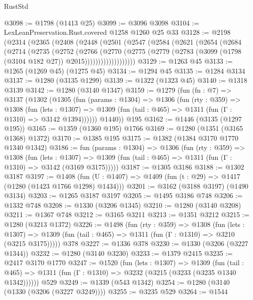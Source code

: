 \begin{lexlean}{RustStd}
\begin{coremodule}
@3098 := @1798 (@1413 @25)
@3099 := @3096 @3098
@3104 := LexLeanPreservation.Rust.covered @1258 @1260 @25 @33
@3128 := @2198
    (@2314
      (@2365
        (@2408
          (@2448
            (@2501
              (@2547
                (@2584
                  (@2621
                    (@2654
                      (@2684
                        (@2714
                          (@2735
                            (@2752
                              (@2766
                                (@2770
                                  (@2775
                                    (@2779
                                      (@2783
                                        (@3099 (@1798 (@3104 @182 @27)) @2015)))))))))))))))))))
@3129 := @1263 @45
@3133 := @1265 (@1269 @45) (@1275 @45)
@3134 := @1294 @45
@3135 := @1284 @3134
@3137 := @1280 (@3135 @1299)
@3139 := @1322 (@1323 @45)
@3140 := @1318 @3139
@3142 := @1280 (@3140 @1347)
@3159 := @1279
    (fun (fn : @7) =>
    @3137
      (@1302
        (@1305
          (fun (params : @1304) =>
          @1306
            (fun (rty : @359) =>
            @1308
              (fun (lets : @1307) =>
              @1309 (fun (tail : @465) => @1311 (fun (Γ : @1310) => @3142 @1394))))))
        @1440))
    @195
@3162 := @1446 (@3135 (@1297 @195))
@3165 := @1359 (@1360 @195) @1766
@3169 := @1280 (@1351 (@3165 @1368) @1372)
@3170 := @1385 @195
@3175 := @1382 (@1384 @3170 @1770 @1340 @1342)
@3186 := fun (params : @1304) =>
  @1306
    (fun (rty : @359) =>
    @1308
      (fun (lets : @1307) =>
      @1309 (fun (tail : @465) => @1311 (fun (Γ : @1310) => @3142 (@3169 @3175)))))
@3187 := @1305 @3186
@3188 := @1302 @3187
@3197 := @1408 (fun (U : @1407) => @1409 (fun (t : @29) => @1417 (@1280 (@1423 @1766 @1298) @1434)))
@3201 := @3162 (@3188 @3197) (@1490 @3134)
@3203 := @1265 @3187 @3197
@3205 := @1495 @3186 @748
@3206 := @1332 @748
@3208 := @1330 (@3206 @1345)
@3210 := @1280 (@3140 @3208)
@3211 := @1367 @748
@3212 := @3165 @3211
@3213 := @1351 @3212
@3215 := @1280 (@3213 @1372)
@3226 := @1498
    (fun (rty : @359) =>
    @1308
      (fun (lets : @1307) =>
      @1309 (fun (tail : @465) => @1311 (fun (Γ : @1310) => @3210 (@3215 @3175)))))
    @378
@3227 := @1336 @378
@3230 := @1330 (@3206 (@3227 @1344))
@3232 := @1280 (@3140 @3230)
@3233 := @1379 @2415
@3235 := @2417 @3170 @1770
@3247 := @1520
    (fun (lets : @1307) =>
    @1309
      (fun (tail : @465) => @1311 (fun (Γ : @1310) => @3232 (@3215 (@3233 (@3235 @1340 @1342))))))
    @529
@3249 := @1339 (@543 @1342)
@3254 := @1280 (@3140 (@1330 (@3206 (@3227 @3249))))
@3255 := @3235 @529
@3264 := @1544

\end{coremodule}
\end{lexlean}
